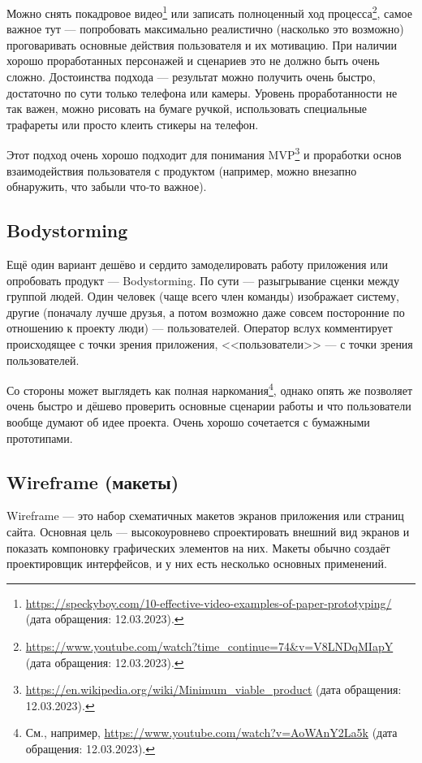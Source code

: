 \documentclass{../../text-style}
\begin{document}
Можно снять покадровое видео\footnote{\url{https://speckyboy.com/10-effective-video-examples-of-paper-prototyping/} (дата обращения: 12.03.2023).} или записать полноценный ход процесса\footnote{\url{https://www.youtube.com/watch?time_continue=74&v=V8LNDqMIapY} (дата обращения: 12.03.2023).}, самое важное тут --- попробовать максимально реалистично (насколько это возможно) проговаривать основные действия пользователя и их мотивацию. При наличии хорошо проработанных персонажей и сценариев это не должно быть очень сложно. Достоинства подхода --- результат можно получить очень быстро, достаточно по сути только телефона или камеры. Уровень проработанности не так важен, можно рисовать на бумаге ручкой, использовать специальные трафареты или просто клеить стикеры на телефон.

Этот подход очень хорошо подходит для понимания MVP\footnote{\url{https://en.wikipedia.org/wiki/Minimum_viable_product} (дата обращения: 12.03.2023).} и проработки основ взаимодействия пользователя с продуктом (например, можно внезапно обнаружить, что забыли что-то важное).

\subsection{Bodystorming}

Ещё один вариант дешёво и сердито замоделировать работу приложения или опробовать продукт --- Bodystorming. По сути --- разыгрывание сценки между группой людей. Один человек (чаще всего член команды) изображает систему, другие (поначалу лучше друзья, а потом возможно даже совсем посторонние по отношению к проекту люди) --- пользователей. Оператор вслух комментирует происходящее с точки зрения приложения, <<пользователи>> --- с точки зрения пользователей.

Со стороны может выглядеть как полная наркомания\footnote{См., например, \url{https://www.youtube.com/watch?v=AoWAnY2La5k} (дата обращения: 12.03.2023).}, однако опять же позволяет очень быстро и дёшево проверить основные сценарии работы и что пользователи вообще думают об идее проекта. Очень хорошо сочетается с бумажными прототипами.

\subsection{Wireframe (макеты)}

Wireframe --- это набор схематичных макетов экранов приложения или страниц сайта. Основная цель --- высокоуровнево спроектировать внешний вид экранов и показать компоновку графических элементов на них. Макеты обычно создаёт проектировщик интерфейсов, и у них есть несколько основных применений.
\end{document}
